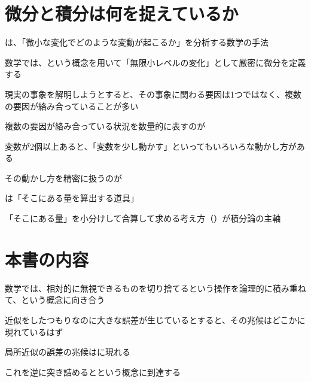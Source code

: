 \documentclass[../book_jiriki_calc]{subfiles}
\begin{document}
\section{微分と積分は何を捉えているか}

は、「微小な変化でどのような変動が起こるか」を分析する数学の手法

数学では、という概念を用いて「無限小レベルの変化」として厳密に微分を定義する

\sectionline

現実の事象を解明しようとすると、その事象に関わる要因は1つではなく、複数の要因が絡み合っていることが多い

複数の要因が絡み合っている状況を数量的に表すのが

\sectionline

変数が2個以上あると、「変数を少し動かす」といってもいろいろな動かし方がある

その動かし方を精密に扱うのが

\sectionline

は「そこにある量を算出する道具」

「そこにある量」を小分けして合算して求める考え方（）が積分論の主軸

\section{本書の内容}

数学では、相対的に無視できるものを切り捨てるという操作を論理的に積み重ねて、という概念に向き合う

\sectionline

近似をしたつもりなのに大きな誤差が生じているとすると、その兆候はどこかに現れているはず

局所近似の誤差の兆候はに現れる

これを逆に突き詰めるとという概念に到達する
\end{document}
